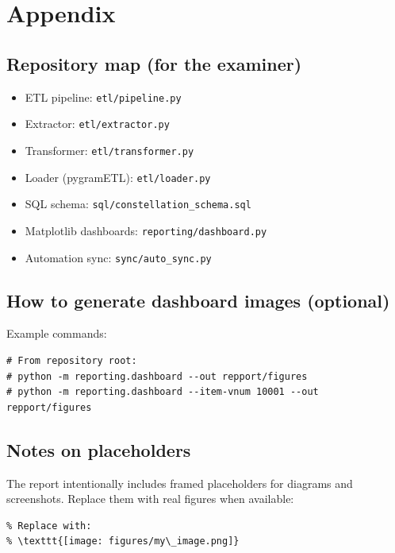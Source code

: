 \chapter{Appendix}

\section{Repository map (for the examiner)}
\begin{itemize}
  \item ETL pipeline: \texttt{etl/pipeline.py}
  \item Extractor: \texttt{etl/extractor.py}
  \item Transformer: \texttt{etl/transformer.py}
  \item Loader (pygramETL): \texttt{etl/loader.py}
  \item SQL schema: \texttt{sql/constellation\_schema.sql}
  \item Matplotlib dashboards: \texttt{reporting/dashboard.py}
  \item Automation sync: \texttt{sync/auto\_sync.py}
\end{itemize}

\section{How to generate dashboard images (optional)}
Example commands:
\begin{lstlisting}[style=python,caption={Generate KPI images into an output folder}]
# From repository root:
# python -m reporting.dashboard --out repport/figures
# python -m reporting.dashboard --item-vnum 10001 --out repport/figures
\end{lstlisting}

\section{Notes on placeholders}
The report intentionally includes framed placeholders for diagrams and screenshots.
Replace them with real figures when available:
\begin{lstlisting}[style=python,caption={Replace placeholder with includegraphics}]
% \placeholderfigure{Title}{0.92\linewidth}{6cm}
% Replace with:
% \texttt{[image: figures/my\_image.png]}
\end{lstlisting}

